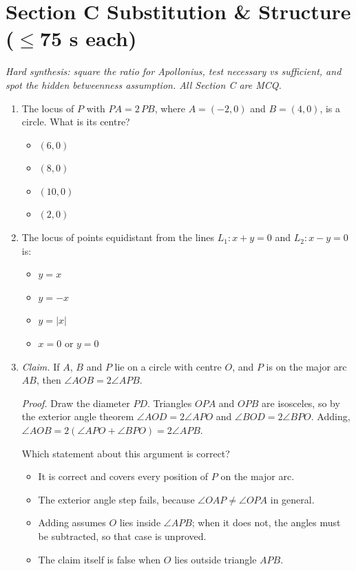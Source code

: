 \documentclass[11pt,a4paper]{article}
\begin{document}
\section*{Section C \quad Substitution \& Structure \hfill{\normalfont\small($\leq$75 s each)}}

\noindent\textit{Hard synthesis: square the ratio for Apollonius, test necessary vs sufficient, and spot the hidden betweenness assumption. All Section C are MCQ.}

\begin{enumerate}

\item The locus of $P$ with $PA=2\,PB$, where $A=(-2,0)$ and $B=(4,0)$, is a circle. What is its centre?
\begin{itemize}
\item[A)] $(6,0)$
\item[B)] $(8,0)$
\item[C)] $(10,0)$
\item[D)] $(2,0)$
\end{itemize}

\item The locus of points equidistant from the lines $L_1:x+y=0$ and $L_2:x-y=0$ is:
\begin{itemize}
\item[A)] $y=x$
\item[B)] $y=-x$
\item[C)] $y=|x|$
\item[D)] $x=0$ or $y=0$
\end{itemize}

\item \emph{Claim.} If $A$, $B$ and $P$ lie on a circle with centre $O$, and $P$ is on the major arc $AB$, then $\angle AOB=2\angle APB$.

\emph{Proof.} Draw the diameter $PD$. Triangles $OPA$ and $OPB$ are isosceles, so by the exterior angle theorem $\angle AOD=2\angle APO$ and $\angle BOD=2\angle BPO$. Adding, $\angle AOB=2(\angle APO+\angle BPO)=2\angle APB$.

Which statement about this argument is correct?
\begin{itemize}
\item[A)] It is correct and covers every position of $P$ on the major arc.
\item[B)] The exterior angle step fails, because $\angle OAP\ne\angle OPA$ in general.
\item[C)] Adding assumes $O$ lies inside $\angle APB$; when it does not, the angles must be subtracted, so that case is unproved.
\item[D)] The claim itself is false when $O$ lies outside triangle $APB$.
\end{itemize}


\end{enumerate}
\end{document}
